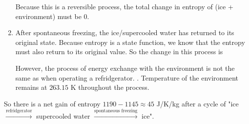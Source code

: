 \documentclass[class=article, crop=false, 12pt]{standalone}
\begin{document}
\begin{example}
\begin{enumerate}
        Because this is a reversible process, 
        the total change in entropy of (ice + environment) must be $0$.
        
        \item After spontaneous freezing, 
        the ice/supercooled water has returned to its original state.
        Because entropy is a state function, 
        we know that the entropy must also return to its original value. 
        So the change in this process is

        However, the process of energy exchange with the environment is not the same as when operating a refridgerator. 
        . 
        Temperature of the environment remains at $263.15$ K throughout the process. 
    \end{enumerate}

    So there is a net gain of entropy $1190-1145 \approx 45$ J/K/kg 
    after a cycle of "ice $\xrightarrow{\text{refridgerator}}$ supercooled water $\xrightarrow{\text{spontaneous freezing}}$ ice".

\end{example}

\theend
\end{document}
